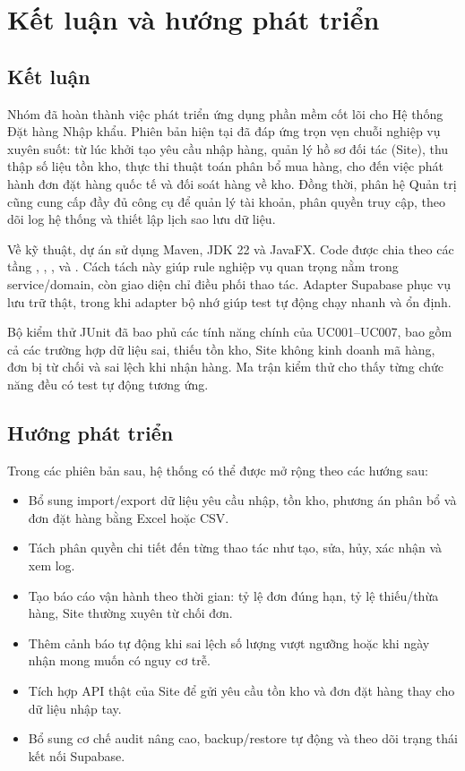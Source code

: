 \chapter{Kết luận và hướng phát triển}

\section{Kết luận}

Nhóm đã hoàn thành việc phát triển ứng dụng phần mềm cốt lõi cho Hệ thống Đặt hàng Nhập khẩu. Phiên bản hiện tại đã đáp ứng trọn vẹn chuỗi nghiệp vụ xuyên suốt: từ lúc khởi tạo yêu cầu nhập hàng, quản lý hồ sơ đối tác (Site), thu thập số liệu tồn kho, thực thi thuật toán phân bổ mua hàng, cho đến việc phát hành đơn đặt hàng quốc tế và đối soát hàng về kho. Đồng thời, phân hệ Quản trị cũng cung cấp đầy đủ công cụ để quản lý tài khoản, phân quyền truy cập, theo dõi log hệ thống và thiết lập lịch sao lưu dữ liệu.

Về kỹ thuật, dự án sử dụng Maven, JDK 22 và JavaFX. Code được chia theo các tầng , , ,  và . Cách tách này giúp rule nghiệp vụ quan trọng nằm trong service/domain, còn giao diện chỉ điều phối thao tác. Adapter Supabase phục vụ lưu trữ thật, trong khi adapter bộ nhớ giúp test tự động chạy nhanh và ổn định.

Bộ kiểm thử JUnit đã bao phủ các tính năng chính của UC001--UC007, bao gồm cả các trường hợp dữ liệu sai, thiếu tồn kho, Site không kinh doanh mã hàng, đơn bị từ chối và sai lệch khi nhận hàng. Ma trận kiểm thử cho thấy từng chức năng đều có test tự động tương ứng.

\section{Hướng phát triển}

Trong các phiên bản sau, hệ thống có thể được mở rộng theo các hướng sau:

\begin{itemize}
  \item Bổ sung import/export dữ liệu yêu cầu nhập, tồn kho, phương án phân bổ và đơn đặt hàng bằng Excel hoặc CSV.
  \item Tách phân quyền chi tiết đến từng thao tác như tạo, sửa, hủy, xác nhận và xem log.
  \item Tạo báo cáo vận hành theo thời gian: tỷ lệ đơn đúng hạn, tỷ lệ thiếu/thừa hàng, Site thường xuyên từ chối đơn.
  \item Thêm cảnh báo tự động khi sai lệch số lượng vượt ngưỡng hoặc khi ngày nhận mong muốn có nguy cơ trễ.
  \item Tích hợp API thật của Site để gửi yêu cầu tồn kho và đơn đặt hàng thay cho dữ liệu nhập tay.
  \item Bổ sung cơ chế audit nâng cao, backup/restore tự động và theo dõi trạng thái kết nối Supabase.
\end{itemize}
